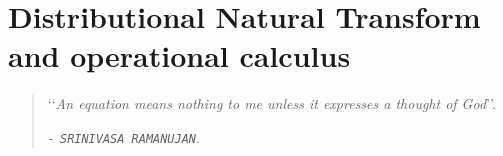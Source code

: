 \chapter{Distributional Natural Transform and operational calculus}
\begin{quote}
\textcolor[rgb]{0.25,0.40,0.60}{\lq\lq\textsl{An equation means nothing to me unless it expresses a thought of God}\rq\rq}.
\begin{flushright}
\textcolor[rgb]{0.55,0.00,0.55}{\em-\texttt{ SRINIVASA RAMANUJAN}}.
\end{flushright}
\end{quote}


